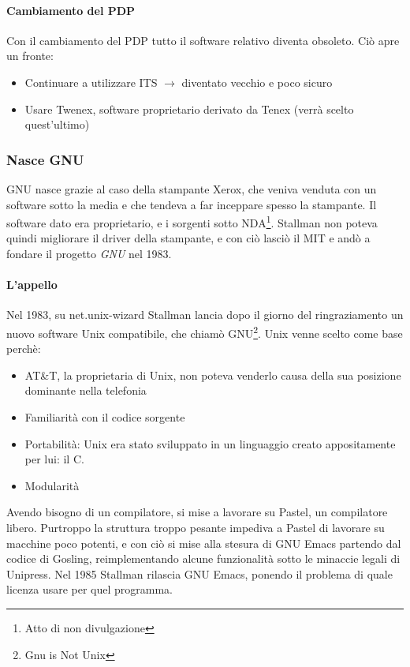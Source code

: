 \paragraph*{Cambiamento del PDP} Con il cambiamento del PDP tutto il software relativo diventa obsoleto. Ci\`o apre un fronte:
\begin{itemize}

\item Continuare a utilizzare ITS $\to$ diventato vecchio e poco sicuro
\item Usare Twenex, software proprietario derivato da Tenex (verr\`a scelto quest'ultimo)

\end{itemize}

\subsubsection{Nasce GNU}

GNU nasce grazie al caso della stampante Xerox, che veniva venduta con un software sotto la media e che tendeva a far inceppare spesso la stampante. Il software dato era proprietario, e i sorgenti sotto NDA\footnote{Atto di non divulgazione}. Stallman non poteva quindi migliorare il driver della stampante, e con ci\`o lasci\`o il MIT e and\`o a fondare il progetto \textit{GNU} nel 1983.

\paragraph*{L'appello} Nel 1983, su net.unix-wizard Stallman lancia dopo il giorno del ringraziamento un nuovo software Unix compatibile, che chiam\`o GNU\footnote{Gnu is Not Unix}. Unix venne scelto come base perch\`e:
\begin{itemize}

\item AT\&T, la proprietaria di Unix, non poteva venderlo causa della sua posizione dominante nella telefonia
\item Familiarit\`a con il codice sorgente
\item Portabilit\`a: Unix era stato sviluppato in un linguaggio creato appositamente per lui: il C.
\item Modularit\`a

\end{itemize}

Avendo bisogno di un compilatore, si mise a lavorare su Pastel, un compilatore libero. Purtroppo la struttura troppo pesante impediva a Pastel di lavorare su macchine poco potenti, e con ci\`o si mise alla stesura di GNU Emacs partendo dal codice di Gosling, reimplementando alcune funzionalit\`a sotto le minaccie legali di Unipress. Nel 1985 Stallman rilascia GNU Emacs, ponendo il problema di quale licenza usare per quel programma.

